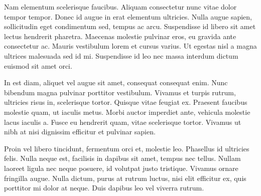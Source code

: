 \documentclass{sig-alternate}
\begin{document}
Nam elementum scelerisque faucibus. Aliquam consectetur nunc vitae dolor tempor tempor. Donec id augue in erat elementum ultricies. Nulla augue sapien, sollicitudin eget condimentum sed, tempus ac arcu. Suspendisse id libero sit amet lectus hendrerit pharetra. Maecenas molestie pulvinar eros, eu gravida ante consectetur ac. Mauris vestibulum lorem et cursus varius. Ut egestas nisl a magna ultrices malesuada sed id mi. Suspendisse id leo nec massa interdum dictum euismod sit amet orci.

In est diam, aliquet vel augue sit amet, consequat consequat enim. Nunc bibendum magna pulvinar porttitor vestibulum. Vivamus et turpis rutrum, ultricies risus in, scelerisque tortor. Quisque vitae feugiat ex. Praesent faucibus molestie quam, ut iaculis metus. Morbi auctor imperdiet ante, vehicula molestie lacus iaculis a. Fusce eu hendrerit quam, vitae scelerisque tortor. Vivamus ut nibh at nisi dignissim efficitur et pulvinar sapien.

Proin vel libero tincidunt, fermentum orci et, molestie leo. Phasellus id ultricies felis. Nulla neque est, facilisis in dapibus sit amet, tempus nec tellus. Nullam laoreet ligula nec neque posuere, id volutpat justo tristique. Vivamus ornare fringilla augue. Nulla dictum, purus at rutrum luctus, nisi elit efficitur ex, quis porttitor mi dolor at neque. Duis dapibus leo vel viverra rutrum.
\end{document}
